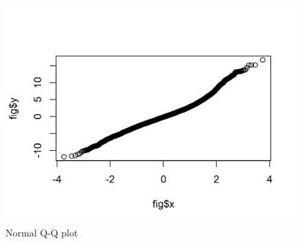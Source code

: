 \begin{figure}[H]
\centering       
    \includegraphics{Images/normality-best-fit.png}
    \caption{Normal Q-Q plot}
    \label{fig:lme-norm}
\end{figure}

